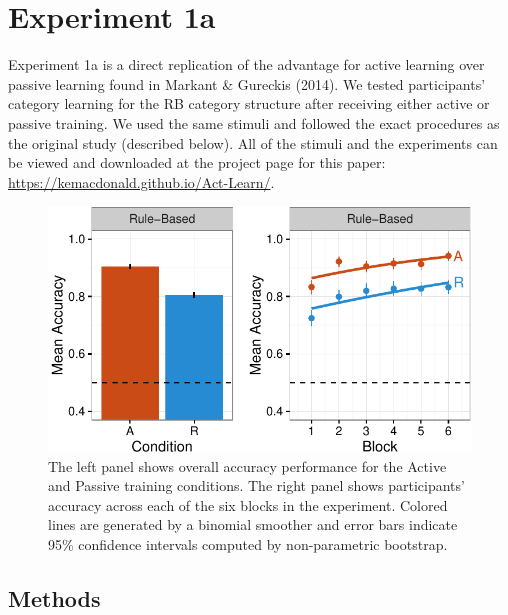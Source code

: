 \documentclass[10pt, letterpaper]{article}
\newenvironment{CodeChunk}{}{}
\begin{document}
\section{Experiment 1a}\label{experiment-1a}

Experiment 1a is a direct replication of the advantage for active
learning over passive learning found in Markant \& Gureckis (2014). We
tested participants' category learning for the RB category structure
after receiving either active or passive training. We used the same
stimuli and followed the exact procedures as the original study
(described below). All of the stimuli and the experiments can be viewed
and downloaded at the project page for this paper:
\url{https://kemacdonald.github.io/Act-Learn/}.

\begin{CodeChunk}
\captionsetup{width=0.8\textwidth}\begin{figure}[t]

{\centering \includegraphics{figs/exp1a_acc_plot-1} 

}

\caption[The left panel shows overall accuracy performance for the Active and Passive training conditions]{The left panel shows overall accuracy performance for the Active and Passive training conditions. The right panel shows participants' accuracy across each of the six blocks in the experiment. Colored lines are generated by a binomial smoother and error bars indicate 95\% confidence intervals computed by non-parametric bootstrap.}\label{fig:exp1a_acc_plot}
\end{figure}
\end{CodeChunk}

\subsection{Methods}\label{methods}
\end{document}
